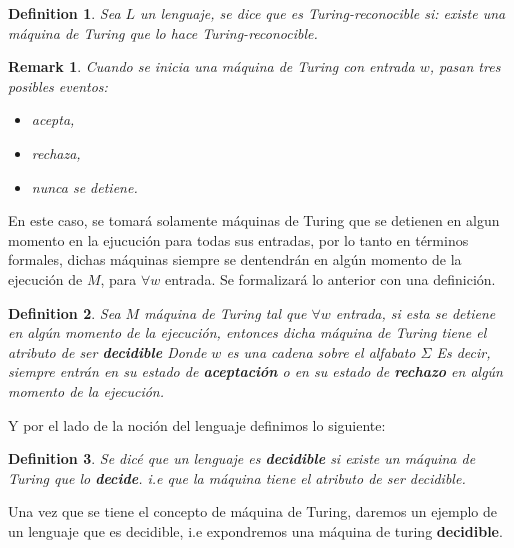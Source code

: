 \documentclass[10pt]{report}
\newtheorem*{remark}{Remark}
\newtheorem{definition}{Definition}
\begin{document}
    \begin{definition}
        Sea $L$ un lenguaje, se dice que es Turing-reconocible si:
        existe una máquina de Turing que lo hace Turing-reconocible.
    \end{definition}

    \begin{remark}
        Cuando se inicia una máquina de Turing con entrada $w$, pasan tres posibles eventos:
        \begin{itemize}
            \item acepta,
            \item rechaza,
            \item nunca se detiene.
        \end{itemize}
    \end{remark}
    En este caso, se tomará solamente máquinas de Turing que se detienen en algun momento en la ejucución para todas sus entradas,
    por lo tanto en términos formales, dichas máquinas siempre se dentendrán en algún momento de la
    ejecución de $M$, para $\forall w$ entrada.
    Se formalizará lo anterior con una definición.
    \begin{definition}
        Sea $M$ máquina de Turing tal que $\forall w$ entrada, si esta se detiene en algún momento de la ejecución,
        entonces dicha máquina de Turing tiene el atributo de ser
        \textbf{decidible}\newline
        Donde $w$ es una cadena sobre el alfabato $\Sigma$
        Es decir, siempre entrán en su estado de \textbf{aceptación}
        o en su estado de \textbf{rechazo} en algún momento de la ejecución.
    \end{definition}
    Y por el lado de la noción del lenguaje definimos lo siguiente:
    \begin{definition}
        Se dicé que un lenguaje es \textbf{decidible} si existe un máquina de Turing
        que lo \textbf{decide}.
        i.e que la máquina tiene el atributo de ser decidible.
    \end{definition}
    Una vez que se tiene el concepto de máquina de Turing, daremos un ejemplo de un lenguaje que es decidible,
    i.e expondremos una máquina de turing \textbf{decidible}.
\end{document}
